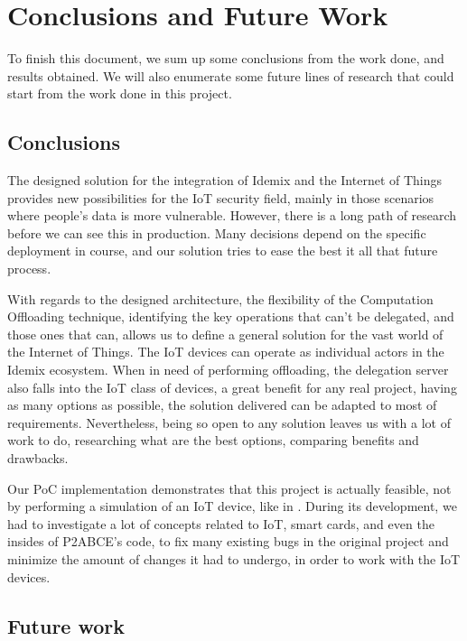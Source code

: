 \chapter{Conclusions and Future Work}\label{ch:conclusions}

To finish this document, we sum up some conclusions from the work done, and results 
obtained. We will also enumerate some future lines of research that could start from
the work done in this project.

\section{Conclusions}


The designed solution for the integration of Idemix and the Internet of Things provides new possibilities for the IoT security field, mainly in those scenarios where people's data is more vulnerable. However, there is a long path of research before we can see this in production. Many decisions depend on the specific deployment in course, and our solution tries to ease the best it all that future process.

With regards to the designed architecture, the flexibility of the Computation Offloading technique, identifying the key operations that can't be delegated, and those ones that can, allows us to define a general solution for the vast world of the Internet of Things. The IoT devices can operate as individual actors in the Idemix ecosystem. When in need of performing offloading, the delegation server also falls into the IoT class of devices, a great benefit for any real project, having as many options as possible, the solution delivered can be adapted to most of requirements. Nevertheless, being so open to any solution leaves us with a lot of work to do, researching what are the best options, comparing benefits and drawbacks.

Our PoC implementation demonstrates that this project is actually feasible, not by performing a simulation of an IoT device, like in \citep{vanet}. During its development, we had to investigate a lot of concepts related to IoT, smart cards, and even the insides of P2ABCE's code, to fix many existing bugs in the original project and minimize the amount of changes it had to undergo, in order to work with the IoT devices. 


\section{Future work}

